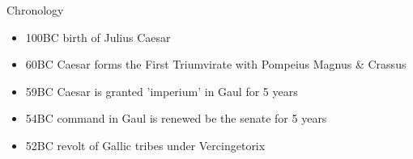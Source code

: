 \documentclass{article}
\begin{document}
	Chronology \\
	\begin{itemize}
		\item 100BC birth of Julius Caesar
		\item 60BC Caesar forms the First Triumvirate with Pompeius Magnus \& Crassus
		\item 59BC Caesar is granted 'imperium' in Gaul for 5 years
		\item 54BC command in Gaul is renewed be the senate for 5 years
		\item 52BC revolt of Gallic tribes under Vercingetorix
	\end{itemize}
\end{document}
